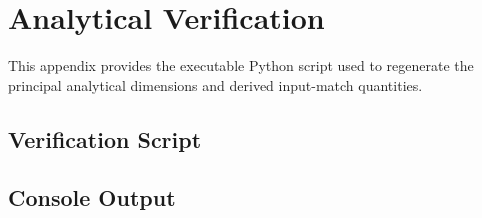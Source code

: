 \chapter{Analytical Verification}
\label{app:analytical-verification}

This appendix provides the executable Python script used to regenerate the principal
analytical dimensions and derived input-match quantities.

\section{Verification Script}



\section{Console Output}


